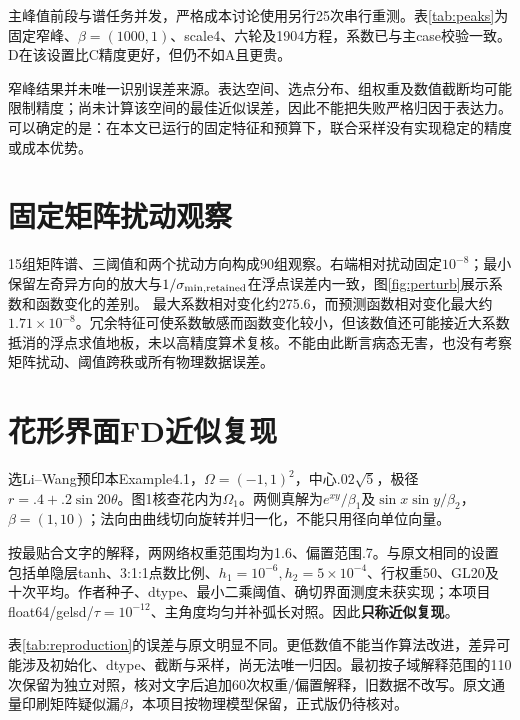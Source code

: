 主峰值前段与谱任务并发，严格成本讨论使用另行25次串行重测。表\ref{tab:peaks}为固定窄峰、$\beta=(1000,1)$、scale4、六轮及1904方程，系数已与主case校验一致。D在该设置比C精度更好，但仍不如A且更贵。
\begin{table}[htbp]\centering\caption{固定峰值场景的串行完整成本，误差均值及样本标准差}\label{tab:peaks}\resizebox{\textwidth}{!}{}\end{table}

窄峰结果并未唯一识别误差来源。表达空间、选点分布、组权重及数值截断均可能限制精度；尚未计算该空间的最佳近似误差，因此不能把失败严格归因于表达力。可以确定的是：在本文已运行的固定特征和预算下，联合采样没有实现稳定的精度或成本优势。

\section{固定矩阵扰动观察}
15组矩阵谱、三阈值和两个扰动方向构成90组观察。右端相对扰动固定$10^{-8}$；最小保留左奇异方向的放大与$1/\sigma_{\min,\rm retained}$在浮点误差内一致，图\ref{fig:perturb}展示系数和函数变化的差别。
最大系数相对变化约275.6，而预测函数相对变化最大约$1.71\times10^{-8}$。冗余特征可使系数敏感而函数变化较小，但该数值还可能接近大系数抵消的浮点求值地板，未以高精度算术复核。不能由此断言病态无害，也没有考察矩阵扰动、阈值跨秩或所有物理数据误差。

\section{花形界面FD近似复现}
选Li--Wang预印本Example4.1\cite{interfacepreprint}，$\Omega=(-1,1)^2$，中心$.02\sqrt5$，极径$r=.4+.2\sin20\theta$。图1核查花内为$\Omega_1$。两侧真解为$e^{xy}/\beta_1$及$\sin x\sin y/\beta_2$，$\beta=(1,10)$；法向由曲线切向旋转并归一化，不能只用径向单位向量。

按最贴合文字的解释，两网络权重范围均为1.6、偏置范围.7。与原文相同的设置包括单隐层tanh、3:1:1点数比例、$h_1=10^{-6},h_2=5\times10^{-4}$、行权重50、GL20及十次平均。作者种子、dtype、最小二乘阈值、确切界面测度未获实现；本项目float64/gelsd/$\tau=10^{-12}$、主角度均匀并补弧长对照。因此\textbf{只称近似复现}。
\begin{table}[htbp]\centering\small\caption{原文表1与本项目近似复现，十种子均值}\label{tab:reproduction}\resizebox{\textwidth}{!}{}\end{table}
表\ref{tab:reproduction}的误差与原文明显不同。更低数值不能当作算法改进，差异可能涉及初始化、dtype、截断与采样，尚无法唯一归因。最初按子域解释范围的110次保留为独立对照，核对文字后追加60次权重/偏置解释，旧数据不改写。原文通量印刷矩阵疑似漏$\beta$，本项目按物理模型保留，正式版仍待核对。


